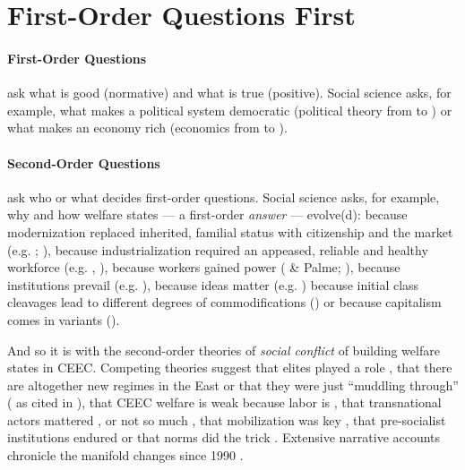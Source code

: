 \documentclass[11pt,a4paper,oneside]{article}
\begin{document}
\newpage

\section{First-Order Questions First}%

\paragraph{First-Order Questions} ask what is good (normative) and what is true (positive). 
Social science asks, for example, what makes a political system democratic (political theory from \citeauthor{Aristoteles} to \citeauthor{Dahl-1989-aa}) or what makes an economy rich (economics from \citeauthor{Smith-1776-lq} to \citeauthor{Hicks1939}).

\paragraph{Second-Order Questions} ask who or what decides first-order questions. 
Social science asks, for example, why and how welfare states --- a first-order \emph{answer} --- evolve(d): 
	because modernization replaced inherited, familial status with citizenship and the market (e.g. \citeauthor{Titmuss1974}; \citeauthor{Marshall-1950-aa}), 
	because industrialization required an appeased, reliable and healthy workforce (e.g. \citeauthor{Flora1981}, \citeauthor{Wilensky1975}), 
	because workers gained power (\citeauthor{Korpi1983} \& Palme; \citeauthor{Jessop2002}), 
	because institutions prevail (e.g. \citeauthor{Rothstein}), 
	because ideas matter (e.g. \citeauthor{Stiller2009}) because initial class cleavages lead to different degrees of commodifications (\citeauthor{Esping-Andersen-1990-aa}) or 
	because capitalism comes in variants (\citeauthor{HallSoskice-2001-aa}). 

And so it is with the second-order theories of \emph{social conflict} of building welfare states in \gls{CEEC}. 
Competing theories suggest that elites played a role \citep{Aidukaite2006}, 
	that there are altogether new regimes in the East \citep{Cerami2006} or 
	that they were just ``muddling through'' (\citealt{Kovasc} as cited in \citealt[28]{Fuchs2008}), 
	that \gls{CEEC} welfare is weak because labor is \citep{Crowley2002}, 
	that transnational actors mattered \citep{Orenstein2009}, or not so much \citep{Sissenich2005}, 
	that mobilization was key \citep{Vanhuysse2006a}, 
	that pre-socialist institutions endured \citep{Inglot2008} or that norms did the trick \citep{Schimmelfennig2001}. 
Extensive narrative accounts chronicle the manifold changes since 1990 \citep[e.g.][ed]{Deacon1992}. 
\end{document}
